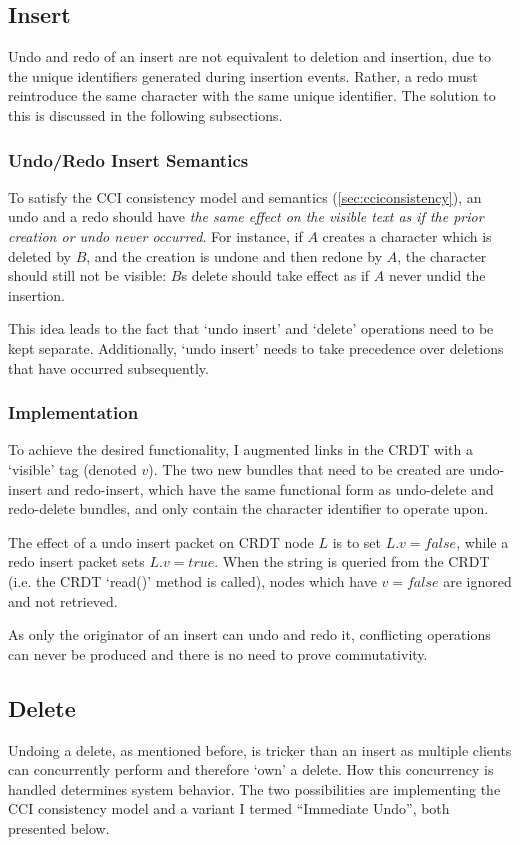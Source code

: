 \documentclass[12pt,a4paper,twoside,openright]{report}
\begin{document}
	
	\subsection{Insert}
	Undo and redo of an insert are not equivalent to deletion and insertion, due to the unique identifiers generated during insertion events. Rather, a redo must reintroduce the same character with the same unique identifier. The solution to this is discussed in the following subsections.
	
		\subsubsection{Undo/Redo Insert Semantics}
		To satisfy the CCI consistency model and semantics (\cref{sec:cciconsistency}), an undo and a redo should have \textit{the same effect on the visible text as if the prior creation or undo never occurred}. For instance, if $A$ creates a character which is deleted by $B$, and the creation is undone and then redone by $A$, the character should still not be visible: $B$s delete should take effect as if $A$ never undid the insertion.
		
		This idea leads to the fact that `undo insert' and `delete' operations need to be kept separate. Additionally, `undo insert' needs to take precedence over deletions that have occurred subsequently.
		
		\subsubsection{Implementation}
		
		To achieve the desired functionality, I augmented links in the CRDT with a `visible' tag (denoted $v$). The two new bundles that need to be created are undo-insert and redo-insert, which have the same functional form as undo-delete and redo-delete bundles, and only contain the character identifier to operate upon.
		
		The effect of a undo insert packet on CRDT node $L$ is to set $L.v = false$, while a redo insert packet sets $L.v = true$. When the string is queried from the CRDT (i.e. the CRDT `read()' method is called), nodes which have $v = false$ are ignored and not retrieved.
		
		As only the originator of an insert can undo and redo it, conflicting operations can never be produced and there is no need to prove commutativity.
		
	\subsection{Delete}
		Undoing a delete, as mentioned before, is tricker than an insert as multiple clients can concurrently perform and therefore `own' a delete. How this concurrency is handled determines system behavior. The two possibilities are implementing the CCI consistency model and a variant I termed ``Immediate Undo'', both presented below.
		
\end{document}
